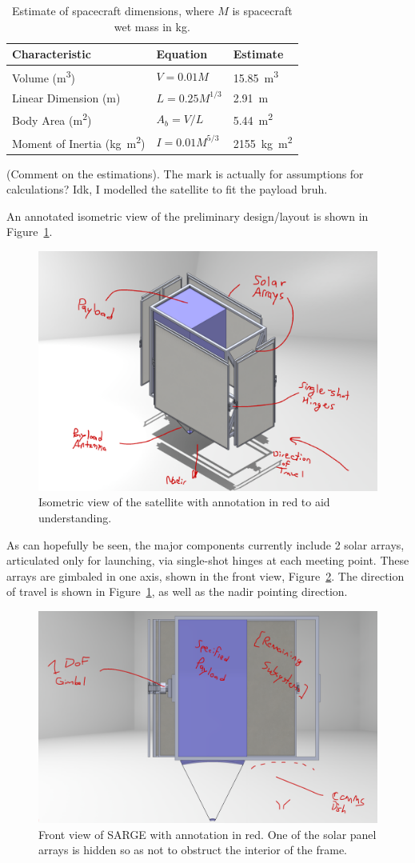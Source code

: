 \documentclass[9pt]{article}
\begin{document}
\begin{table}[h]
  \centering
  \captionsetup{width=.75\linewidth,font=small,labelfont=bf}
  \begin{tabular}{lll}
    \toprule
    Characteristic & Equation & Estimate \\
    \midrule
    Volume (\si{\meter\cubed}) & $V=0.01M$ & \qty{15.85}{\meter\cubed}\\
    Linear Dimension (\si{\meter}) & $L=0.25M^{1/3}$ & \qty{2.91}{\meter}\\
    Body Area (\si{\meter\squared}) & $A_b=V/L$ & \qty{5.44}{\meter\squared}\\
    Moment of Inertia (\si{\kilo\gram\meter\squared}) & $I=0.01M^{5/3}$ & \qty{2155}{\kilo\gram\meter\squared}\\
    \bottomrule
  \end{tabular}
  \caption{Estimate of spacecraft dimensions, where $M$ is spacecraft wet mass in \si{\kilo\gram}.}\label{tab:sizeest}
\end{table}

(Comment on the estimations). The mark is actually for assumptions for calculations? Idk, I modelled the satellite to fit the payload bruh.


An annotated isometric view of the preliminary design/layout is shown in Figure~\ref{fig:iso}.

\begin{figure}[h]
  \centering
  \captionsetup{width=.75\linewidth,font=small,labelfont=bf}
  \includegraphics[width=.4\linewidth]{iso}
  \caption{Isometric view of the satellite with annotation in red to aid understanding.}
  \label{fig:iso}
\end{figure}

As can hopefully be seen, the major components currently include 2 solar arrays, articulated only for launching, via single-shot hinges at each meeting point.
These arrays are gimbaled in one axis, shown in the front view, Figure~\ref{fig:front}.
The direction of travel is shown in Figure~\ref{fig:iso}, as well as the nadir pointing direction.

\begin{figure}[h]
  \centering
  \captionsetup{width=.75\linewidth,font=small,labelfont=bf}
  \includegraphics[width=.4\linewidth]{front}
  \caption{Front view of SARGE with annotation in red. One of the solar panel arrays is hidden so as not to obstruct the interior of the frame.}
  \label{fig:front}
\end{figure}
\end{document}

